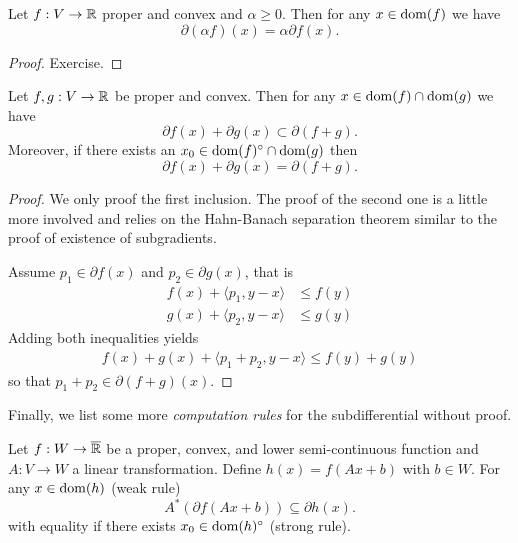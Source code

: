 \begin{theorem}
    Let $f:V\rightarrow\mathbb{R}$ proper and convex and $\alpha\geq 0$. Then for any $x\in\operatorname{\mathrm{dom}}(f)$ we have
    \[
        \partial(\alpha f)(x) = \alpha\partial f(x).
    \]
\end{theorem}
\begin{proof}
    Exercise.
\end{proof}

\begin{theorem}
    Let $f,g:V\rightarrow\mathbb{R}$ be proper and convex. Then for any $x\in\operatorname{\mathrm{dom}}(f)\cap\operatorname{\mathrm{dom}}(g)$ we have
    \[
        \partial f(x) + \partial g(x)\subset \partial (f+g).
    \]
    Moreover, if there exists an $x_0\in \operatorname{\mathrm{dom}}(f)^\circ \cap\operatorname{\mathrm{dom}}(g)$ then
    \[
        \partial f(x) + \partial g(x) = \partial (f+g).
    \]
\end{theorem}
\begin{proof}
    We only proof the first inclusion. The proof of the second one is a little more involved and relies on the Hahn-Banach separation theorem similar to the proof of existence of subgradients.

    Assume $p_1\in \partial f(x)$ and  $p_2\in \partial g(x)$, that is
    \begin{equation}
        \begin{aligned}
            f(x) + \langle p_1, y-x\rangle&\leq f(y)\\
            g(x) + \langle p_2, y-x\rangle&\leq g(y)
        \end{aligned}
    \end{equation}
    Adding both inequalities yields
    \begin{equation}
        \begin{aligned}
            f(x)+ g(x) + \langle p_1+p_2, y-x\rangle \leq f(y) + g(y)
        \end{aligned}
    \end{equation}
    so that $p_1+p_2\in \partial (f+g)(x)$.
\end{proof}

Finally, we list some more \emph{computation rules} for the subdifferential without proof.
\begin{theorem}
    Let $f:W\rightarrow\overline{\mathbb{R}}$ be a proper, convex, and lower semi-continuous function and $A:V\rightarrow W$ a linear transformation.
    Define $h(x)=f(Ax+b)$ with $b\in W$. For any $x\in\operatorname{\mathrm{dom}}(h)$ (weak rule)
    \[
        A^\ast(\partial f(Ax+b))\subseteq\partial h(x).
    \]
    with equality if there exists $x_0\in \operatorname{\mathrm{dom}}(h)^\circ$ (strong rule).
\end{theorem}


